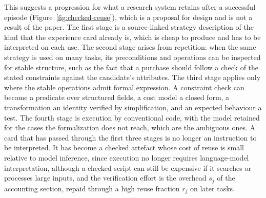 \documentclass[11pt]{article}
\theoremstyle{remark}
\begin{document}
This suggests a progression for what a research system retains after a successful episode (Figure~\ref{fig:checked-reuse}), which is a proposal for design and is not a result of the paper. The first stage is a source-linked strategy description of the kind that the experience card already is, which is cheap to produce and has to be interpreted on each use. The second stage arises from repetition: when the same strategy is used on many tasks, its preconditions and operations can be inspected for stable structure, such as the fact that a purchase should follow a check of the stated constraints against the candidate's attributes. The third stage applies only where the stable operations admit formal expression. A constraint check can become a predicate over structured fields, a cost model a closed form, a transformation an identity verified by simplification, and an expected behaviour a test. The fourth stage is execution by conventional code, with the model retained for the cases the formalization does not reach, which are the ambiguous ones. A card that has passed through the first three stages is no longer an instruction to be interpreted. It has become a checked artefact whose cost of reuse is small relative to model inference, since execution no longer requires language-model interpretation, although a checked script can still be expensive if it searches or processes large inputs, and the verification effort is the overhead $s_j$ of the accounting section, repaid through a high reuse fraction $r_j$ on later tasks.
\end{document}
